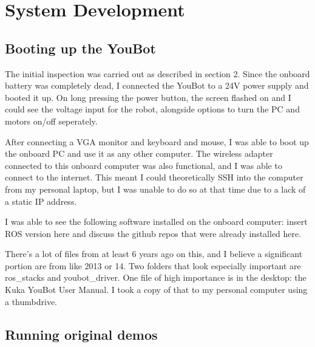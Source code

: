 \documentclass[a4paper, 12pt]{article}
\newif\ifshownotes
\newcommand{\notes}[1]{\ifshownotes\textcolor{blue}{#1}\fi}
\begin{document}
    \pagebreak

    \section{System Development}
    \subsection{Booting up the YouBot}

    \notes{describe the booting up process here, what ports to use, how to connect to the onboard computer, etc.}

    \notes{furthermore describe issues with software that needed to be fixed, such as the bashrc file, the networking, etc.}

    The initial inspection was carried out as described in section 2. Since the onboard battery was completely dead, I connected the YouBot to a 24V power supply and booted it up. On long pressing the power button, the screen flashed on and I could see the voltage input for the robot, alongside options to turn the PC and motors on/off seperately. 

    After connecting a VGA monitor and keyboard and mouse, I was able to boot up the onboard PC and use it as any other computer. The wireless adapter connected to this onboard computer was also functional, and I was able to connect to the internet. This meant I could theoretically SSH into the computer from my personal laptop, but I was unable to do so at that time due to a lack of a static IP address.


    
    I was able to see the following software installed on the onboard computer: insert ROS version here and discuss the github repos that were already installed here. 

    There’s a lot of files from at least 6 years ago on this, and I believe a significant portion are from like 2013 or 14. Two folders that look especially important are ros\_stacks and youbot\_driver. One file of high importance is in the desktop: the Kuka YouBot User Manual. I took a copy of that to my personal computer using a thumbdrive.  
    
    \notes{discuss powering up, initial software inspection, static IP issue}
    
    
    \pagebreak

    \subsection{Running original demos}
    \notes{describe fixing network issue, and hten running the original demos.}
\end{document}
